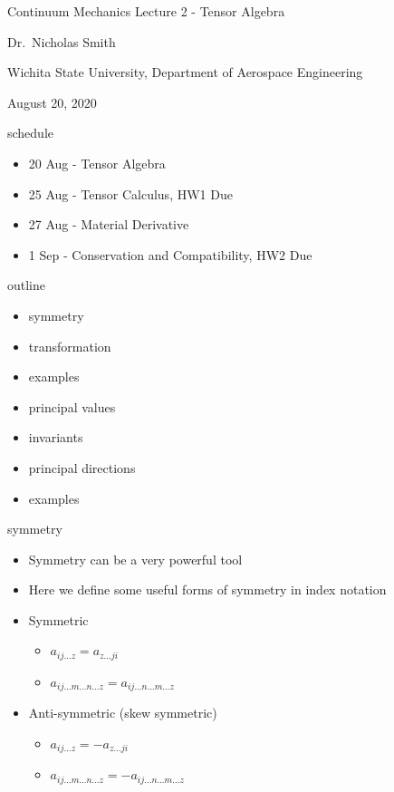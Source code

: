 \documentclass[12pt,handout]{beamer}
\providecommand{\tightlist}{%
  \setlength{\itemsep}{0pt}\setlength{\parskip}{0pt}}
\begin{document}
\begin{frame}{Continuum Mechanics}
\protect\hypertarget{continuum-mechanics}{}
Lecture 2 - Tensor Algebra

Dr.~Nicholas Smith

Wichita State University, Department of Aerospace Engineering

August 20, 2020
\end{frame}

\begin{frame}{schedule}
\protect\hypertarget{schedule}{}
\begin{itemize}
\tightlist
\item
  20 Aug - Tensor Algebra
\item
  25 Aug - Tensor Calculus, HW1 Due
\item
  27 Aug - Material Derivative
\item
  1 Sep - Conservation and Compatibility, HW2 Due
\end{itemize}
\end{frame}

\begin{frame}{outline}
\protect\hypertarget{outline}{}
\begin{itemize}
\tightlist
\item
  symmetry
\item
  transformation
\item
  examples
\item
  principal values
\item
  invariants
\item
  principal directions
\item
  examples
\end{itemize}
\end{frame}

\begin{frame}{symmetry}
\protect\hypertarget{symmetry}{}
\begin{itemize}
\tightlist
\item
  Symmetry can be a very powerful tool
\item
  Here we define some useful forms of symmetry in index notation
\item
  Symmetric

  \begin{itemize}
  \tightlist
  \item
    \(a_{ij...z} = a_{z...ji}\)
  \item
    \(a_{ij...m...n...z} = a_{ij...n...m...z}\)
  \end{itemize}
\item
  Anti-symmetric (skew symmetric)

  \begin{itemize}
  \tightlist
  \item
    \(a_{ij...z} = -a_{z...ji}\)
  \item
    \(a_{ij...m...n...z} = -a_{ij...n...m...z}\)
  \end{itemize}
\end{itemize}
\end{frame}
\end{document}
